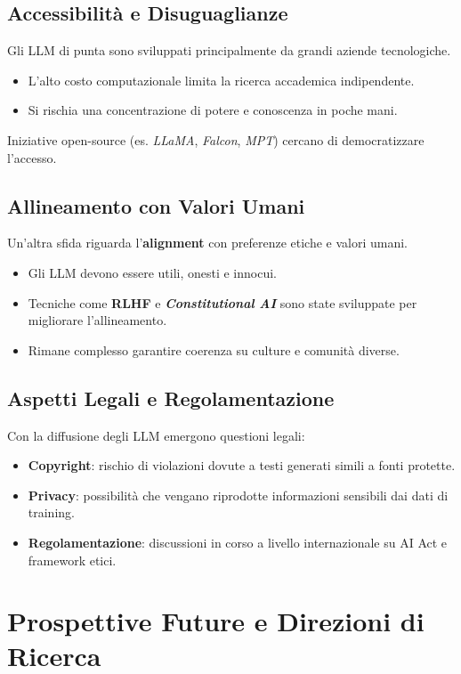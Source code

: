 \subsection{Accessibilità e Disuguaglianze}
Gli LLM di punta sono sviluppati principalmente da grandi aziende tecnologiche.
\begin{itemize}
    \item L'alto costo computazionale limita la ricerca accademica indipendente.
    \item Si rischia una concentrazione di potere e conoscenza in poche mani.
\end{itemize}
Iniziative open-source (es. \textit{LLaMA}, \textit{Falcon}, \textit{MPT}) cercano di democratizzare l'accesso.

\subsection{Allineamento con Valori Umani}
Un'altra sfida riguarda l'\textbf{alignment} con preferenze etiche e valori umani.
\begin{itemize}
    \item Gli LLM devono essere utili, onesti e innocui.
    \item Tecniche come \textbf{RLHF} e \textbf{\textit{Constitutional AI}} sono state sviluppate 
    per migliorare l'allineamento.
    \item Rimane complesso garantire coerenza su culture e comunità diverse.
\end{itemize}

\subsection{Aspetti Legali e Regolamentazione}
Con la diffusione degli LLM emergono questioni legali:
\begin{itemize}
    \item \textbf{Copyright}: rischio di violazioni dovute a testi generati simili a fonti protette.
    \item \textbf{Privacy}: possibilità che vengano riprodotte informazioni sensibili dai dati di training.
    \item \textbf{Regolamentazione}: discussioni in corso a livello internazionale su AI Act e framework etici.
\end{itemize}

\newpage
\section{Prospettive Future e Direzioni di Ricerca}

